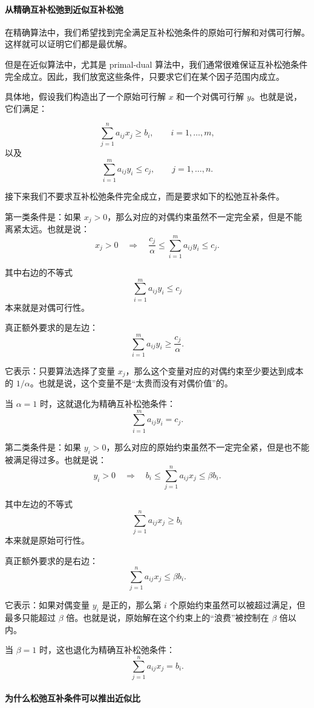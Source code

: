 \documentclass[UTF8,openany,12pt]{ctexbook}
\theoremstyle{remark}
\begin{document}
\paragraph{从精确互补松弛到近似互补松弛}

在精确算法中，我们希望找到完全满足互补松弛条件的原始可行解和对偶可行解。这样就可以证明它们都是最优解。

但是在近似算法中，尤其是 primal-dual 算法中，我们通常很难保证互补松弛条件完全成立。因此，我们放宽这些条件，只要求它们在某个因子范围内成立。

具体地，假设我们构造出了一个原始可行解 $x$ 和一个对偶可行解 $y$。也就是说，它们满足：

\[
\sum_{j=1}^n a_{ij}x_j\ge b_i,
\qquad i=1,\dots,m,
\]
以及
\[
\sum_{i=1}^m a_{ij}y_i\le c_j,
\qquad j=1,\dots,n.
\]

接下来我们不要求互补松弛条件完全成立，而是要求如下的松弛互补条件。

第一类条件是：如果 $x_j>0$，那么对应的对偶约束虽然不一定完全紧，但是不能离紧太远。也就是说：
\[
x_j>0
\quad\Longrightarrow\quad
\frac{c_j}{\alpha}
\le
\sum_{i=1}^m a_{ij}y_i
\le
c_j.
\]

其中右边的不等式
\[
\sum_{i=1}^m a_{ij}y_i\le c_j
\]
本来就是对偶可行性。

真正额外要求的是左边：
\[
\sum_{i=1}^m a_{ij}y_i\ge \frac{c_j}{\alpha}.
\]

它表示：只要算法选择了变量 $x_j$，那么这个变量对应的对偶约束至少要达到成本的 $1/\alpha$。也就是说，这个变量不是“太贵而没有对偶价值”的。

当 $\alpha=1$ 时，这就退化为精确互补松弛条件：
\[
\sum_{i=1}^m a_{ij}y_i=c_j.
\]

第二类条件是：如果 $y_i>0$，那么对应的原始约束虽然不一定完全紧，但是也不能被满足得过多。也就是说：
\[
y_i>0
\quad\Longrightarrow\quad
b_i
\le
\sum_{j=1}^n a_{ij}x_j
\le
\beta b_i.
\]

其中左边的不等式
\[
\sum_{j=1}^n a_{ij}x_j\ge b_i
\]
本来就是原始可行性。

真正额外要求的是右边：
\[
\sum_{j=1}^n a_{ij}x_j\le \beta b_i.
\]

它表示：如果对偶变量 $y_i$ 是正的，那么第 $i$ 个原始约束虽然可以被超过满足，但最多只能超过 $\beta$ 倍。也就是说，原始解在这个约束上的“浪费”被控制在 $\beta$ 倍以内。

当 $\beta=1$ 时，这也退化为精确互补松弛条件：
\[
\sum_{j=1}^n a_{ij}x_j=b_i.
\]

\paragraph{为什么松弛互补条件可以推出近似比}
\end{document}
